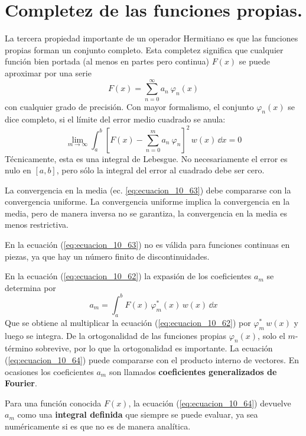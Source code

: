 \section{Completez de las funciones propias.}
La tercera propiedad importante de un operador Hermitiano es que las funciones propias forman un conjunto completo. Esta completez significa que cualquier función bien portada (al menos en partes pero continua) $F(x)$ se puede aproximar por una serie
\begin{equation}
F(x) = \sum_{n=0}^{\infty} a_{n} \: \varphi_{n}(x) 
\label{eq:ecuacion_10_62}
\end{equation}
con cualquier grado de precisión. Con mayor formalismo, el conjunto $\varphi_{n} (x)$ se dice completo, si el límite del error medio cuadrado se anula:
\begin{equation}
\lim_{m \to \infty} \int_{a}^{b} \left[ F(x) - \sum_{n=0}^{m} a_{n} \: \varphi_{n} \right]^{2} \, w(x) \, \dd{x} = 0
\label{eq:ecuacion_10_63}
\end{equation}
Técnicamente, esta es una integral de Lebesgue. No necesariamente el error es nulo en $[a,b]$, pero sólo la integral del error al cuadrado debe ser cero.
\par
La convergencia en la media (ec. \ref{eq:ecuacion_10_63}) debe compararse con la convergencia uniforme. La convergencia uniforme implica la convergencia en la media, pero de manera inversa no se garantiza, la convergencia en la media es menos restrictiva.
\par
En la ecuación (\ref{eq:ecuacion_10_63}) no es válida para funciones continuas en piezas, ya que hay un número finito de discontinuidades.
\par
 En la ecuación (\ref{eq:ecuacion_10_62}) la expasión de los coeficientes $a_{m}$ se determina por
\begin{equation}
a_{m} = \int_{a}^{b} F(x) \, \varphi_{m}^{*} (x) \, w(x) \, \dd{x}
\label{eq:ecuacion_10_64}
\end{equation}
Que se obtiene al multiplicar la ecuación (\ref{eq:ecuacion_10_62}) por $\varphi_{m}^{*} \, w(x)$ y luego se integra. De la ortogonalidad de las funciones propias $\varphi_{n}(x)$, solo el $m$-término sobrevive, por lo que la ortogonalidad es importante. La ecuación (\ref{eq:ecuacion_10_64}) puede compararse con el producto interno de vectores. En ocasiones los coeficientes $a_{m}$ son llamados \textbf{coeficientes generalizados de Fourier}.
\par
Para una función conocida $F(x)$, la ecuación (\ref{eq:ecuacion_10_64}) devuelve $a_{m}$ como una \textbf{integral definida} que siempre se puede evaluar, ya sea numéricamente si es que no es de manera analítica.
